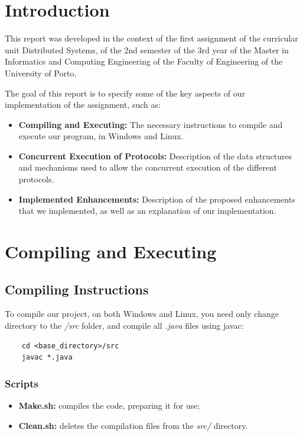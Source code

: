 \documentclass[a4paper]{article}
\begin{document}
\newpage
\tableofcontents

\newpage
\section{Introduction}

This report was developed in the context of the first assignment of the curricular unit Distributed Systems, of the 2nd
semester of the 3rd year of the Master in Informatics and Computing Engineering of the Faculty of Engineering of the
University of Porto.

The goal of this report is to specify some of the key aspects of our implementation of the assignment, such as:

\begin{itemize}
    \item \textbf{Compiling and Executing:} The necessary instructions to compile and execute our program, in Windows and
    Linux.
    \item \textbf{Concurrent Execution of Protocols:} Description of the data structures and mechanisms used to allow the
    concurrent execution of the different protocols.
    \item \textbf{Implemented Enhancements:} Description of the proposed enhancements that we implemented, as well as an
    explanation of our implementation.
\end{itemize}

\newpage

\section{Compiling and Executing}

\subsection{Compiling Instructions}
To compile our project, on both Windows and Linux, you need only change directory to the \textit{/src} folder, and compile
all \textit{.java} files using javac:
\begin{lstlisting}
    cd <base_directory>/src
    javac *.java
\end{lstlisting}
\subsubsection{Scripts}
\begin{itemize}
    \item \textbf{Make.sh:} compiles the code, preparing it for use;
    \item \textbf{Clean.sh:} deletes the compilation files from the \textit{src/} directory.
\end{itemize}
\bigskip
\end{document}
